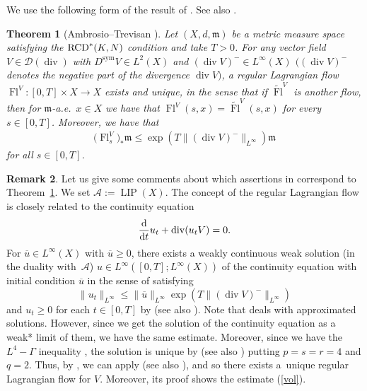 \documentclass[pdftex]{sigma}
\numberwithin{equation}{section}
\newtheorem{Thm}{Theorem}[section]
\theoremstyle{definition}
\newtheorem{Rem}[Thm]{Remark}
\newcommand{\LIP}{\operatorname{LIP}}
\newcommand{\sym}{\operatorname{sym}}
\newcommand{\Fl}{\operatorname{Fl}}
\newcommand{\mf}{\mathfrak{m}}
\newcommand{\Div}{\operatorname{div}}
\newcommand{\RCD}{{\rm RCD}^\ast}
\newcommand{\A}{\mathcal{A}}
\begin{document}
We use the following form of the result of \cite{AT1}. See also \cite{AT2}.
\begin{Thm}[Ambrosio--Trevisan \cite{AT1}]\label{RLF}
Let $(X,d,\mf)$ be a metric measure space satisfying the $\RCD(K,N)$ condition and take $T>0$.
For any vector field $V\in\mathcal{D}(\Div)$ with $D^{\sym}V\in L^2(X)$ and $(\Div V)^{-}\in L^\infty (X)$ $((\Div V)^{-}$ denotes the negative part of the divergence $\Div V)$, a regular Lagrangian flow $\Fl^V \colon [0,T]\times X\to X$ exists and unique, in the sense that if $\widetilde{\Fl}^V$ is another flow, then for $\mf$-a.e.\ $x\in X$ we have that $\Fl^V(s,x)=\widetilde{\Fl}^V(s,x)$ for every $s\in[0,T]$.
Moreover, we have that
\begin{gather}\label{vol}
\big(\Fl^V_s\big)_\ast\mf\leq \exp(T\|(\Div V)^-\|_{L^\infty})\mf
\end{gather}
for all $s\in [0,T]$.
\end{Thm}
\begin{Rem}
Let us give some comments about which assertions in \cite{AT1} correspond to Theorem~\ref{RLF}.
We set $\A:=\LIP(X)$.
The concept of the regular Lagrangian flow is closely related to the continuity equation
\[
\frac{\rm d}{{\rm d}t} u_t+\Div(u_t V)=0.
\]
For $\overline{u}\in L^\infty(X)$ with $\overline{u}\geq 0$, there exists a weakly continuous weak solution (in the duality with~$\A$) $u\in L^\infty([0,T]; L^\infty(X))$ of the continuity equation with initial condition $\overline{u}$ in the sense of \cite[Definition~4.2]{AT1} satisfying
\[
\|u_t\|_{L^\infty}\leq \|\overline{u}\|_{L^\infty}\exp(T\|(\Div V)^{-}\|_{L^\infty})
\]
and $u_t\geq 0$ for each $t\in [0,T]$ by \cite[Theorems~4.3 and~4.6]{AT1} (see also \cite[Theorem~6.1]{AT2}).
Note that \cite[Theorem~4.6]{AT1} deals with approximated solutions.
However, since we get the solution of the continuity equation as a weak* limit of them, we have the same estimate.
Moreover, since we have the $L^4-\Gamma$ inequality \cite[Definition~5.1 and~Corollary~6.3]{AT1}, the solution is unique by \cite[Theorem~5.4]{AT1} (see also \cite[Theorem~6.4]{AT2}) putting $p=s=r=4$ and $q=2$.
Thus, by \cite[Theorem~9.2]{AT1}, we can apply \cite[Theorem~7.7]{AT2} (see also \cite[Theorem~8.3]{AT1}), and so there exists a~unique regular Lagrangian flow for $V$.
Moreover, its proof shows the estimate (\ref{vol}).
\end{Rem}
\end{document}
